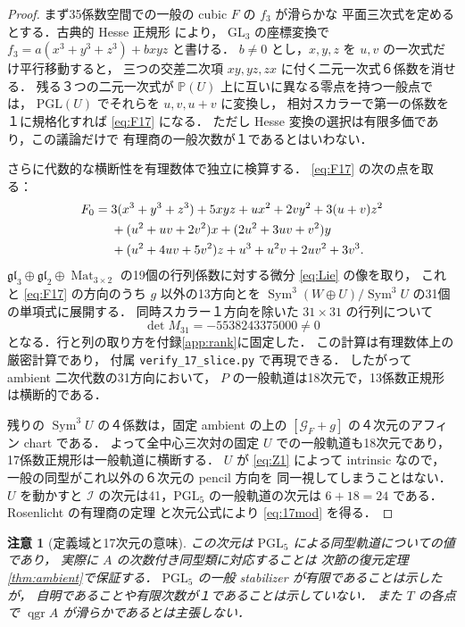 \documentclass[11pt,a4paper]{ltjsarticle}
\numberwithin{equation}{section}
\newtheorem{remark}[theorem]{注意}
\newcommand{\PP}{\mathbb P}
\newcommand{\cI}{\mathcal I}
\newcommand{\Sym}{\operatorname{Sym}}
\newcommand{\qgr}{\operatorname{qgr}}
\newcommand{\GL}{\mathrm{GL}}
\newcommand{\PGL}{\mathrm{PGL}}
\begin{document}
\begin{proof}
まず35係数空間での一般の cubic $F$ の $f_3$ が滑らかな
平面三次式を定めるとする．古典的 Hesse 正規形
\cite[\S2, Lemma~2.1]{AD} により，
$\GL_3$ の座標変換で $f_3=a(x^3+y^3+z^3)+bxyz$ と書ける．
$b\ne0$ とし，$x,y,z$ を $u,v$ の一次式だけ平行移動すると，
三つの交差二次項 $xy,yz,zx$ に付く二元一次式６係数を消せる．
残る３つの二元一次式が $\PP(U)$ 上に互いに異なる零点を持つ一般点では，
$\PGL(U)$ でそれらを $u,v,u+v$ に変換し，
相対スカラーで第一の係数を１に規格化すれば \eqref{eq:F17} になる．
ただし Hesse 変換の選択は有限多価であり，この議論だけで
有理商の一般次数が１であるとはいわない．

さらに代数的な横断性を有理数体で独立に検算する．
\eqref{eq:F17} の次の点を取る：
\begin{align}\label{eq:F0}
 F_0={}&3(x^3+y^3+z^3)+5xyz+ux^2+2vy^2+3(u+v)z^2\notag\\
 &+(u^2+uv+2v^2)x+(2u^2+3uv+v^2)y\\
 &+(u^2+4uv+5v^2)z+u^3+u^2v+2uv^2+3v^3.\notag
\end{align}
$\mathfrak{gl}_3\oplus\mathfrak{gl}_2\oplus\operatorname{Mat}_{3\times2}$
の19個の行列係数に対する微分 \eqref{eq:Lie} の像を取り，
これと \eqref{eq:F17} の方向のうち $g$ 以外の13方向とを
$\Sym^3(W\oplus U)/\Sym^3U$ の31個の単項式に展開する．
同時スカラー１方向を除いた $31\times31$ の行列について
\begin{equation}\label{eq:det}
 \boxed{\det M_{31}=-5538243375000\ne0}
\end{equation}
となる．行と列の取り方を付録\ref{app:rank}に固定した．
この計算は有理数体上の厳密計算であり，
付属 \texttt{verify\_17\_slice.py} で再現できる．
したがって ambient 二次代数の31方向において，
$P$ の一般軌道は18次元で，13係数正規形は横断的である．

残りの $\Sym^3U$ の４係数は，固定 ambient の上の
$[\mathcal G_F+g]$ の４次元のアフィン chart である．
よって全中心三次対の固定 $U$ での一般軌道も18次元であり，
17係数正規形は一般軌道に横断する．
$U$ が \eqref{eq:Z1} によって intrinsic なので，
一般の同型がこれ以外の６次元の pencil 方向を
同一視してしまうことはない．
$U$ を動かすと $\cI$ の次元は41，$\PGL_5$ の一般軌道の次元は
$6+18=24$ である．Rosenlicht の有理商の定理 \cite{Rosenlicht}
と次元公式により \eqref{eq:17mod} を得る．
\end{proof}

\begin{remark}[定義域と17次元の意味]\label{rem:meaning}
この次元は $\PGL_5$ による同型軌道についての値であり，
実際に $A$ の次数付き同型類に対応することは
次節の復元定理\ref{thm:ambient}で保証する．
$\PGL_5$ の一般 stabilizer が有限であることは示したが，
自明であることや有限次数が１であることは示していない．
また $T$ の各点で $\qgr A$ が滑らかであるとは主張しない．
\end{remark}
\end{document}
